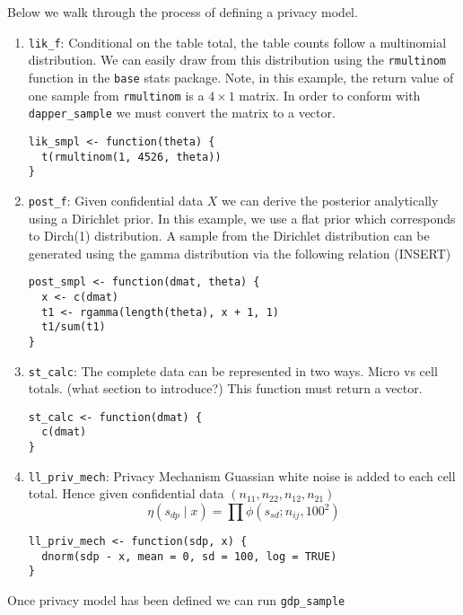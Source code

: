 Below we walk through the process of defining a privacy model.

\begin{enumerate}
\def\labelenumi{\arabic{enumi}.}
\item
  \texttt{lik\_f}: Conditional on the table total, the table counts follow a multinomial
  distribution. We can easily draw from this distribution using the
  \texttt{rmultinom} function in the \texttt{base} stats package. Note, in this example,
  the return value of one sample from \texttt{rmultinom} is a \(4 \times 1\) matrix. In order to
  conform with \texttt{dapper\_sample} we must convert the matrix to a vector.

\begin{verbatim}
lik_smpl <- function(theta) {
  t(rmultinom(1, 4526, theta))
}
\end{verbatim}
\item
  \texttt{post\_f}: Given confidential data \(X\) we can derive the posterior analytically
  using a Dirichlet prior. In this example, we use a flat prior which
  corresponds to Dirch(1) distribution. A sample from the Dirichlet distribution
  can be generated using the gamma distribution via the following relation (INSERT)

\begin{verbatim}
post_smpl <- function(dmat, theta) {
  x <- c(dmat)
  t1 <- rgamma(length(theta), x + 1, 1)
  t1/sum(t1)
}
\end{verbatim}
\item
  \texttt{st\_calc}: The complete data can be represented in two ways. Micro vs cell totals.
  (what section to introduce?) This function must return a vector.

\begin{verbatim}
st_calc <- function(dmat) {
  c(dmat)
}
\end{verbatim}
\item
  \texttt{ll\_priv\_mech}: Privacy Mechanism
  Guassian white noise is added to each cell total. Hence given
  confidential data \((n_{11}, n_{22}, n_{12}, n_{21})\)
  \[
  \eta(s_{dp} \mid x) = \prod \phi(s_{sd}; n_{ij}, 100^2)
  \]

\begin{verbatim}
ll_priv_mech <- function(sdp, x) {
  dnorm(sdp - x, mean = 0, sd = 100, log = TRUE)
}
\end{verbatim}
\end{enumerate}

Once privacy model has been defined we can run \texttt{gdp\_sample}


